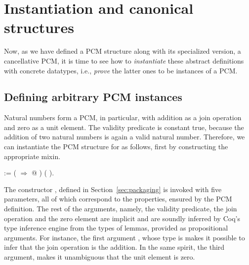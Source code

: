 \section{Instantiation and canonical structures}




Now, as we have defined a PCM structure along with its specialized
version, a cancellative PCM, it is time to see how to \textit{instantiate}
these abstract definitions with concrete datatypes, i.e., \textit{prove} the
latter ones to be instances of a PCM.




\subsection{Defining arbitrary PCM instances}




Natural numbers form a PCM, in particular, with addition as a join
operation and zero as a unit element. The validity predicate is
constant true, because the addition of two natural numbers is again a
valid natural number. Therefore, we can instantiate the PCM structure
for  as follows, first by constructing the appropriate mixin.


\begin{coqdoccode}
\coqdocemptyline
\coqdocnoindent
{}  := \coqdoceol
\coqdocindent{1.00em}
    (   \ensuremath{\Rightarrow} @ ) ( \coqdocvar{\_}).\coqdoceol
\coqdocemptyline
\end{coqdoccode}


The constructor , defined in Section~\ref{sec:packaging}
is invoked with five parameters, all of which correspond to the
properties, ensured by the PCM definition. The rest of the arguments,
namely, the validity predicate, the join operation and the zero
element are implicit and are soundly inferred by Coq's type inference
engine from the types of lemmas, provided as propositional
arguments. For instance, the first argument , whose type is
  makes it possible to infer that the join operation
is the addition. In the same spirit, the third argument,  makes
it unambiguous that the unit element is zero.


